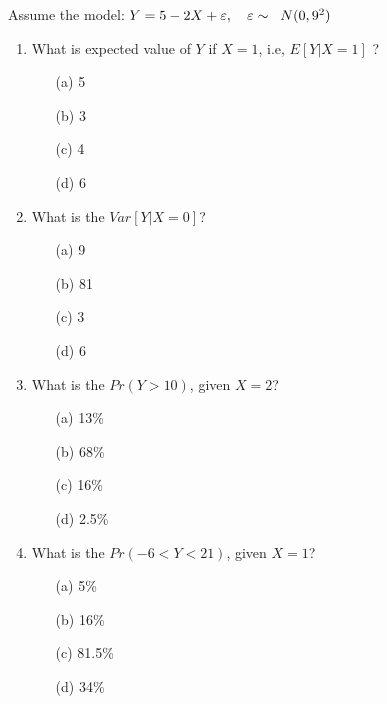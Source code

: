 \documentclass[12pt]{article}
\begin{document}
\vskip 1cm
\noindent 
{Assume the model:
$Y = 5 -2X  + \varepsilon, \quad \varepsilon \sim \hspace{0.2cm} N(0,9^2)$}
\vskip 1cm
\begin{enumerate}
\item What is expected value of $Y$ if $X=1$, i.e, $E[Y|X=1]$ ? 
\begin{itemize}
\item[(a)] 5
\item[(b)] 3
\item[(c)] 4
\item[(d)] 6
\end{itemize}

\item What is the $Var[Y|X=0]$?
\begin{itemize}
\item[(a)] 9
\item[(b)] 81
\item[(c)] 3
\item[(d)] 6
\end{itemize}

\item What is the $Pr(Y>10)$, given $X=2$?   
\begin{itemize}
\item[(a)] 13\%
\item[(b)] 68\%
\item[(c)] 16\%
\item[(d)] 2.5\%
\end{itemize}

\item What is the $Pr(-6<Y<21)$, given $X=1$?
\begin{itemize}
\item[(a)] 5\%
\item[(b)] 16\%
\item[(c)] 81.5\%
\item[(d)] 34\%
\end{itemize}
\end{enumerate}

\newpage
\end{document}
